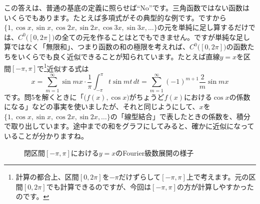 この答えは、普通の基底の定義に照らせば``No''です。三角函数ではない函数はいくらでもあります。たとえば多項式がその典型的な例です。ですから$\{1, \cos x, \sin x, \cos 2x, \sin 2x, \cos 3x, \sin 3x, \ldots\}$の元を単純に足し算するだけでは、$C^0\bigl([0, 2\pi]\bigr)$の全ての元を作ることはとでもできません。ですが単純な足し算ではなく「無限和」、つまり函数の和の極限を考えれば、$C^0\bigl([0, 2\pi]\big)$の函数たちをいくらでも良く近似できることが知られています。たとえば直線$y = x$を区間$[-\pi, \pi]$で\footnote{計算の都合上、区間$[0, 2\pi]$を$-\pi$だけずらして$[-\pi, \pi]$上で考えます。元の区間$[0, 2\pi]$でも計算できるのですが、今回は$[-\pi, \pi]$の方が計算しやすかったのです。}近似する式は
\[
x = \sum_{m = 1}^{\infty} \sin mx \cdot \frac{1}{\pi} \int_{-\pi}^{\pi} t \sin mt\, dt = \sum_{m = 1}^{\infty} (-1)^{m + 1} \frac{2}{m} \sin mx
\]
です。問5を解くときに「$\bigl(f(x), \cos x\bigr)$がちょうど$f(x)$における$\cos x$の係数になる」などの事実を使いましたが、それと同じようにして、$x$を$\{1, \cos x, \sin x, \cos 2x, \sin 2x, \ldots\}$の「線型結合」で表したときの係数を、積分で取り出しています。途中までの和をグラフにしてみると、確かに近似になっていることが分かりますね。

\begin{figure}[h!tbp]
\centering
{} \raisebox{3zw}{$\longrightarrow$}
 \raisebox{3zw}{$\longrightarrow$}
 \raisebox{3zw}{$\longrightarrow$}
\caption{閉区間$[-\pi, \pi]$における$y = x$のFourier級数展開の様子}
\end{figure}


